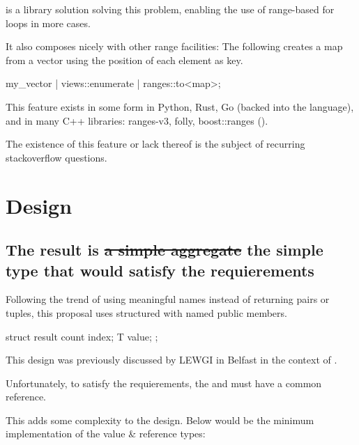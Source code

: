 \documentclass{wg21}
\begin{document}
 is a library solution solving this problem, enabling the use of range-based for loops in more cases.

It also composes nicely with other range facilities:
The following creates a map from a vector using the position of each element as key.

\begin{colorblock}
my_vector | views::enumerate | ranges::to<map>;
\end{colorblock}

This feature exists in some form in Python, Rust, Go (backed into the language), and in many C++ libraries: ranges-v3, folly, boost::ranges ().


The existence of this feature or lack thereof is the subject of recurring stackoverflow questions.


\section{Design}

\subsection{The result is \sout{a simple aggregate} the simple type that would satisfy the  requierements}

Following the trend of using meaningful names instead of returning pairs or tuples, this proposal uses structured with named public members.
\begin{colorblock}
struct result {
    count index;
    T value;
};
\end{colorblock}

This design was previously discussed by LEWGI in Belfast in the context of .

Unfortunately, to satisfy the  requierements, the  and  must have a common
reference.

This adds some complexity to the design.
Below would be the minimum implementation of the value \& reference types:
\end{document}
